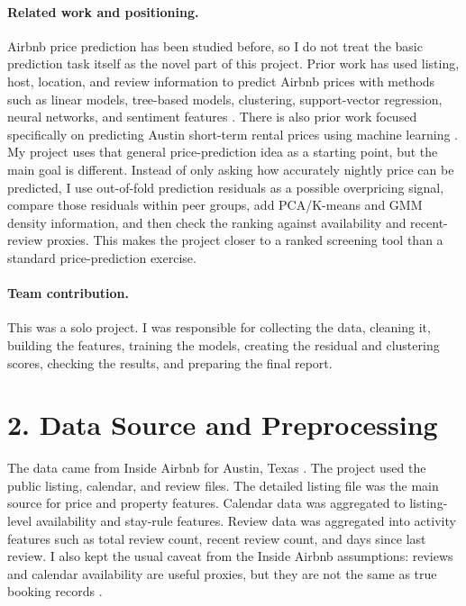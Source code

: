 \documentclass[11pt]{article}
\begin{document}
\paragraph{Related work and positioning.} Airbnb price prediction has been studied before, so I do not treat the basic prediction task itself as the novel part of this project. Prior work has used listing, host, location, and review information to predict Airbnb prices with methods such as linear models, tree-based models, clustering, support-vector regression, neural networks, and sentiment features \cite{airbnb_ml_sentiment}. There is also prior work focused specifically on predicting Austin short-term rental prices using machine learning \cite{austin_airbnb_dynamic}. My project uses that general price-prediction idea as a starting point, but the main goal is different. Instead of only asking how accurately nightly price can be predicted, I use out-of-fold prediction residuals as a possible overpricing signal, compare those residuals within peer groups, add PCA/K-means and GMM density information, and then check the ranking against availability and recent-review proxies. This makes the project closer to a ranked screening tool than a standard price-prediction exercise.

\paragraph{Team contribution.} This was a solo project. I was responsible for collecting the data, cleaning it, building the features, training the models, creating the residual and clustering scores, checking the results, and preparing the final report.

\section*{2. Data Source and Preprocessing}

The data came from Inside Airbnb for Austin, Texas \cite{insideairbnb_data}. The project used the public listing, calendar, and review files. The detailed listing file was the main source for price and property features. Calendar data was aggregated to listing-level availability and stay-rule features. Review data was aggregated into activity features such as total review count, recent review count, and days since last review. I also kept the usual caveat from the Inside Airbnb assumptions: reviews and calendar availability are useful proxies, but they are not the same as true booking records \cite{insideairbnb_assumptions}.
\end{document}
